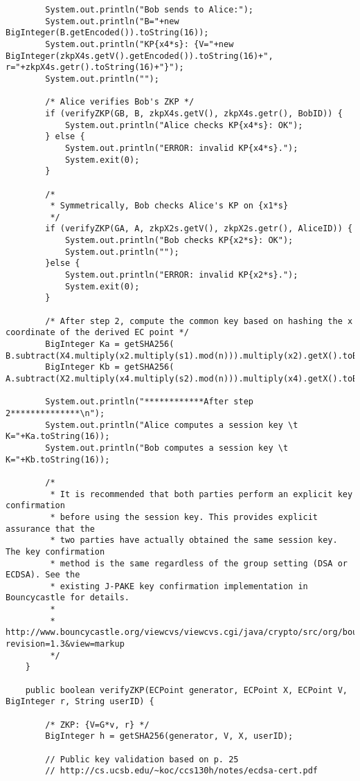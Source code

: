 \documentclass[../PFC.tex]{subfiles}
\begin{document}
\begin{lstlisting}
    	System.out.println("Bob sends to Alice:");
    	System.out.println("B="+new BigInteger(B.getEncoded()).toString(16));
    	System.out.println("KP{x4*s}: {V="+new BigInteger(zkpX4s.getV().getEncoded()).toString(16)+", r="+zkpX4s.getr().toString(16)+"}");
    	System.out.println("");		
    	
    	/* Alice verifies Bob's ZKP */
    	if (verifyZKP(GB, B, zkpX4s.getV(), zkpX4s.getr(), BobID)) {
    		System.out.println("Alice checks KP{x4*s}: OK");
    	} else {
    		System.out.println("ERROR: invalid KP{x4*s}.");
    		System.exit(0);
    	}
    	
    	/*
    	 * Symmetrically, Bob checks Alice's KP on {x1*s}
    	 */
    	if (verifyZKP(GA, A, zkpX2s.getV(), zkpX2s.getr(), AliceID)) {
    		System.out.println("Bob checks KP{x2*s}: OK");
    		System.out.println("");
    	}else {
    		System.out.println("ERROR: invalid KP{x2*s}.");
    		System.exit(0);
    	}
    	
    	/* After step 2, compute the common key based on hashing the x coordinate of the derived EC point */    	
    	BigInteger Ka = getSHA256( B.subtract(X4.multiply(x2.multiply(s1).mod(n))).multiply(x2).getX().toBigInteger());
    	BigInteger Kb = getSHA256( A.subtract(X2.multiply(x4.multiply(s2).mod(n))).multiply(x4).getX().toBigInteger());
		
    	System.out.println("************After step 2**************\n");
    	System.out.println("Alice computes a session key \t K="+Ka.toString(16));
    	System.out.println("Bob computes a session key \t K="+Kb.toString(16));
    	    	
    	/* 
    	 * It is recommended that both parties perform an explicit key confirmation
    	 * before using the session key. This provides explicit assurance that the 
    	 * two parties have actually obtained the same session key. The key confirmation
    	 * method is the same regardless of the group setting (DSA or ECDSA). See the 
    	 * existing J-PAKE key confirmation implementation in Bouncycastle for details. 
    	 * 
    	 * http://www.bouncycastle.org/viewcvs/viewcvs.cgi/java/crypto/src/org/bouncycastle/crypto/agreement/jpake/JPAKEUtil.java?revision=1.3&view=markup
    	 */
    }

    public boolean verifyZKP(ECPoint generator, ECPoint X, ECPoint V, BigInteger r, String userID) {
    	
    	/* ZKP: {V=G*v, r} */    	    	
    	BigInteger h = getSHA256(generator, V, X, userID);
    	
    	// Public key validation based on p. 25
    	// http://cs.ucsb.edu/~koc/ccs130h/notes/ecdsa-cert.pdf
    	

\end{lstlisting}
\end{document}
